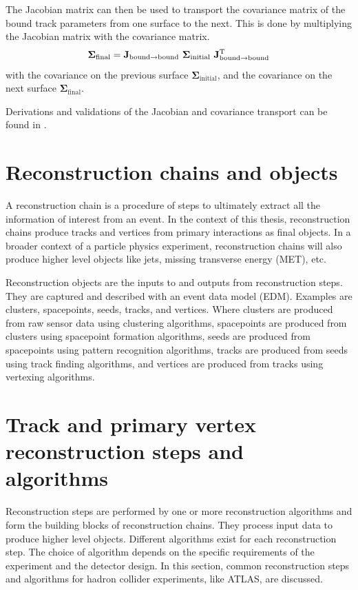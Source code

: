 The Jacobian matrix can then be used to transport the covariance matrix of the bound track parameters from one surface to the next. This is done by multiplying the Jacobian matrix with the covariance matrix.
\begin{equation}
    \mathbf{\Sigma}_{\text{final}} = \mathbf{J}_{\text{bound\textrightarrow bound}} \ \mathbf{\Sigma}_{\text{initial}} \ \mathbf{J}_{\text{bound\textrightarrow bound}}^\mathrm{T}
\end{equation}
with the covariance on the previous surface $\mathbf{\Sigma}_{\text{initial}}$, and the covariance on the next surface $\mathbf{\Sigma}_{\text{final}}$.

Derivations and validations of the Jacobian and covariance transport can be found in \textcite{bomki-jac}.

\section{Reconstruction chains and objects}

A reconstruction chain is a procedure of steps to ultimately extract all the information of interest from an event. In the context of this thesis, reconstruction chains produce tracks and vertices from primary interactions as final objects. In a broader context of a particle physics experiment, reconstruction chains will also produce higher level objects like jets, missing transverse energy (MET), etc.

Reconstruction objects are the inputs to and outputs from reconstruction steps. They are captured and described with an event data model (EDM). Examples are clusters, spacepoints, seeds, tracks, and vertices. Where clusters are produced from raw sensor data using clustering algorithms, spacepoints are produced from clusters using spacepoint formation algorithms, seeds are produced from spacepoints using pattern recognition algorithms, tracks are produced from seeds using track finding algorithms, and vertices are produced from tracks using vertexing algorithms.

\section{Track and primary vertex reconstruction steps and algorithms}
\label{sec:intro/reco/reco-steps}

Reconstruction steps are performed by one or more reconstruction algorithms and form the building blocks of reconstruction chains. They process input data to produce higher level objects. Different algorithms exist for each reconstruction step. The choice of algorithm depends on the specific requirements of the experiment and the detector design. In this section, common reconstruction steps and algorithms for hadron collider experiments, like ATLAS, are discussed.

